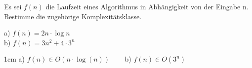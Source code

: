 \question[2]
Es sei $f(n)$ die Laufzeit eines Algorithmus in Abhängigkeit von der Eingabe n. Bestimme die zugehörige
Komplexitätsklasse.

a) $f(n) = 2n \cdot \log n$  \\
b) $f(n) = 3n^2 + 4\cdot 3^n$
\begin{solutionbox}{1cm}
a) $f(n) \in O(n \cdot  \log(n))$  ~~~
b) $f(n) \in O(3^n)$
\end{solutionbox}
